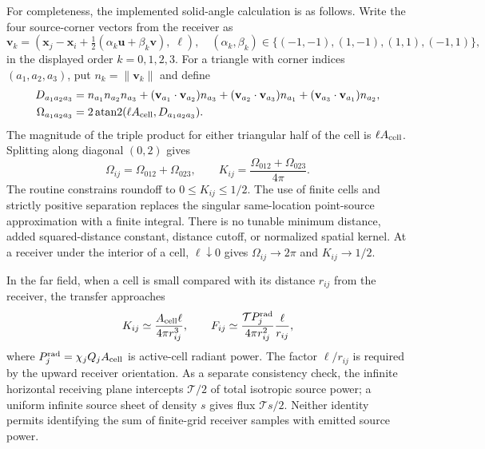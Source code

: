 \documentclass[11pt,a4paper]{article}
\begin{document}
For completeness, the implemented solid-angle calculation is as follows.
Write the four source-corner vectors from the receiver as
\begin{equation}
 \mathbf v_k=(\mathbf x_j-\mathbf x_i
             +\tfrac12(\alpha_k\mathbf u+\beta_k\mathbf v),\;\ell),
 \quad
 (\alpha_k,\beta_k)\in\{(-1,-1),(1,-1),(1,1),(-1,1)\},
\end{equation}
in the displayed order $k=0,1,2,3$. For a triangle with corner indices
$(a_1,a_2,a_3)$, put $n_k=\|\mathbf v_k\|$ and define
\begin{align}
 D_{a_1a_2a_3}
 &=n_{a_1}n_{a_2}n_{a_3}
 +(\mathbf v_{a_1}\cdot\mathbf v_{a_2})n_{a_3}
 +(\mathbf v_{a_2}\cdot\mathbf v_{a_3})n_{a_1}
 +(\mathbf v_{a_3}\cdot\mathbf v_{a_1})n_{a_2},\\
 \Omega_{a_1a_2a_3}
 &=2\operatorname{atan2}(\ell A_{\rm cell},D_{a_1a_2a_3}).
\end{align}
The magnitude of the triple product for either triangular half of the cell
is $\ell A_{\rm cell}$. Splitting along diagonal $(0,2)$ gives
\begin{equation}
 \Omega_{ij}=\Omega_{012}+\Omega_{023},
 \qquad K_{ij}=\frac{\Omega_{012}+\Omega_{023}}{4\pi}.
\end{equation}
The routine constrains roundoff to $0\le K_{ij}\le1/2$. The use of finite
cells and strictly positive separation replaces the singular same-location
point-source approximation with a finite integral. There is no tunable
minimum distance, added squared-distance constant, distance cutoff, or
normalized spatial kernel. At a receiver under the interior of a cell,
$\ell\downarrow0$ gives $\Omega_{ij}\to2\pi$ and $K_{ij}\to1/2$.

In the far field, when a cell is small compared with its distance $r_{ij}$
from the receiver, the transfer approaches
\begin{equation}
 K_{ij}\simeq\frac{A_{\rm cell}\ell}{4\pi r_{ij}^3},
 \qquad
 F_{ij}\simeq\frac{\mathcal T P_j^{\rm rad}}{4\pi r_{ij}^2}\frac{\ell}{r_{ij}},
\end{equation}
where $P_j^{\rm rad}=\chi_j Q_jA_{\rm cell}$ is active-cell radiant power. The factor
$\ell/r_{ij}$ is required by the upward receiver orientation. As a separate
consistency check, the infinite horizontal receiving plane intercepts
$\mathcal T/2$ of total isotropic source power; a uniform infinite source sheet
of density $s$ gives flux $\mathcal T s/2$. Neither identity permits identifying
the sum of finite-grid receiver samples with emitted source power.
\end{document}
